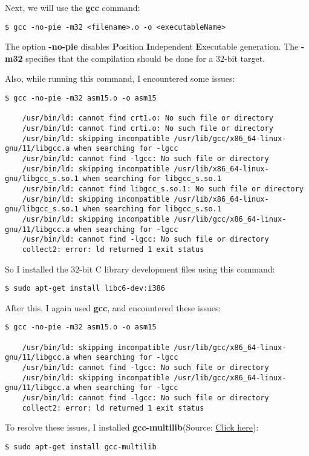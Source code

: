 \documentclass{article}
\begin{document}
Next, we will use the \textbf{gcc} command:
\begin{Verbatim}[frame=single]
	$ gcc -no-pie -m32 <filename>.o -o <executableName>
\end{Verbatim}
The option \textbf{-no-pie} disables \textbf{P}osition \textbf{I}ndependent \textbf{E}xecutable generation. The \textbf{-m32} specifies that the compilation should be done for a $32$-bit target.

Also, while running this command, I encountered some issues:
\begin{lstlisting}[frame=single, breaklines=true]
	$ gcc -no-pie -m32 asm15.o -o asm15
	
	/usr/bin/ld: cannot find crt1.o: No such file or directory
	/usr/bin/ld: cannot find crti.o: No such file or directory
	/usr/bin/ld: skipping incompatible /usr/lib/gcc/x86_64-linux-gnu/11/libgcc.a when searching for -lgcc
	/usr/bin/ld: cannot find -lgcc: No such file or directory
	/usr/bin/ld: skipping incompatible /usr/lib/x86_64-linux-gnu/libgcc_s.so.1 when searching for libgcc_s.so.1
	/usr/bin/ld: cannot find libgcc_s.so.1: No such file or directory
	/usr/bin/ld: skipping incompatible /usr/lib/x86_64-linux-gnu/libgcc_s.so.1 when searching for libgcc_s.so.1
	/usr/bin/ld: skipping incompatible /usr/lib/gcc/x86_64-linux-gnu/11/libgcc.a when searching for -lgcc
	/usr/bin/ld: cannot find -lgcc: No such file or directory
	collect2: error: ld returned 1 exit status
\end{lstlisting} %
So I installed the $32$-bit C library development files using this command:
\begin{lstlisting}[frame=single]
	$ sudo apt-get install libc6-dev:i386
\end{lstlisting}
\newpage
After this, I again used \textbf{gcc}, and encountered these issues:

\begin{lstlisting}[frame=single, breaklines=true]
	$ gcc -no-pie -m32 asm15.o -o asm15
	
	/usr/bin/ld: skipping incompatible /usr/lib/gcc/x86_64-linux-gnu/11/libgcc.a when searching for -lgcc
	/usr/bin/ld: cannot find -lgcc: No such file or directory
	/usr/bin/ld: skipping incompatible /usr/lib/gcc/x86_64-linux-gnu/11/libgcc.a when searching for -lgcc
	/usr/bin/ld: cannot find -lgcc: No such file or directory
	collect2: error: ld returned 1 exit status
\end{lstlisting}
To resolve these issues, I installed \textbf{gcc-multilib}(Source: \href{https://askubuntu.com/questions/409905/apt-get-error-loading-libgcc-s-so-1}{Click here}):
\begin{lstlisting}[frame=single]
	$ sudo apt-get install gcc-multilib
\end{lstlisting}
\end{document}
